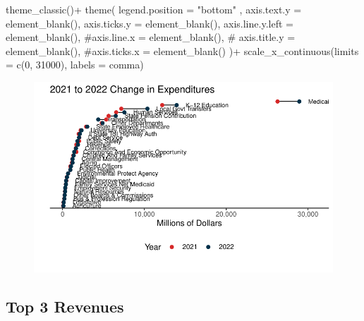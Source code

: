 \documentclass[
  letterpaper,
  DIV=11,
  numbers=noendperiod]{scrreport}
\newenvironment{Shaded}{\begin{snugshade}}{\end{snugshade}}
\newcommand{\AttributeTok}[1]{\textcolor[rgb]{0.40,0.45,0.13}{#1}}
\newcommand{\CommentTok}[1]{\textcolor[rgb]{0.37,0.37,0.37}{#1}}
\newcommand{\DecValTok}[1]{\textcolor[rgb]{0.68,0.00,0.00}{#1}}
\newcommand{\FunctionTok}[1]{\textcolor[rgb]{0.28,0.35,0.67}{#1}}
\newcommand{\NormalTok}[1]{\textcolor[rgb]{0.00,0.23,0.31}{#1}}
\newcommand{\SpecialCharTok}[1]{\textcolor[rgb]{0.37,0.37,0.37}{#1}}
\newcommand{\StringTok}[1]{\textcolor[rgb]{0.13,0.47,0.30}{#1}}
\begin{document}
\begin{Shaded}
\begin{Highlighting}[]
   \FunctionTok{theme\_classic}\NormalTok{()}\SpecialCharTok{+} 
    \FunctionTok{theme}\NormalTok{(}
    \AttributeTok{legend.position =} \StringTok{"bottom"}\NormalTok{ ,}
  \AttributeTok{axis.text.y =} \FunctionTok{element\_blank}\NormalTok{(),}
  \AttributeTok{axis.ticks.y =} \FunctionTok{element\_blank}\NormalTok{(),}
  \AttributeTok{axis.line.y.left  =} \FunctionTok{element\_blank}\NormalTok{(),}
  \CommentTok{\#axis.line.x = element\_blank(),}
   \CommentTok{\# axis.title.y = element\_blank(),}
  \CommentTok{\#axis.ticks.x = element\_blank()}
\NormalTok{  )}\SpecialCharTok{+}
  \FunctionTok{scale\_x\_continuous}\NormalTok{(}\AttributeTok{limits =} \FunctionTok{c}\NormalTok{(}\DecValTok{0}\NormalTok{, }\DecValTok{31000}\NormalTok{), }\AttributeTok{labels =}\NormalTok{ comma)}
\end{Highlighting}
\end{Shaded}

\begin{figure}[H]

{\centering \includegraphics{./Everything_files/figure-pdf/dotplots-2.pdf}

}

\end{figure}

\hypertarget{sec-top-3-revenues}{%
\subsection{Top 3 Revenues}\label{sec-top-3-revenues}}
\end{document}
